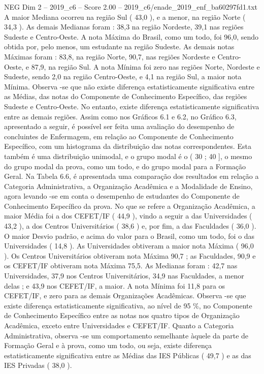 \begin{textsample}{NEG Dim 2 – 2019\_c6 – Score 2.00 – 2019\_c6/enade\_2019\_enf\_ba60297fd1.txt}
A maior Mediana ocorreu na região Sul ( 43,0 ), e a menor, na região Norte ( 34,3 ).
As demais Medianas foram : 38,3 na região Nordeste, 39,1 nas regiões Sudeste e Centro-Oeste.
A nota Máxima do Brasil, como um todo, foi 96,0, sendo obtida por, pelo menos, um estudante na região Sudeste.
As demais notas Máximas foram : 83,8, na região Norte, 90,7, nas regiões Nordeste e Centro-Oeste, e 87,9, na região Sul.
A nota Mínima foi zero nas regiões Norte, Nordeste e Sudeste, sendo 2,0 na região Centro-Oeste, e 4,1 na região Sul, a maior nota Mínima.
Observa -se que não existe diferença estatisticamente significativa entre as Médias, das notas do Componente de Conhecimento Específico, das regiões Sudeste e Centro-Oeste.
No entanto, existe diferença estatisticamente significativa entre as demais regiões.
Assim como nos Gráficos 6.1 e 6.2, no Gráfico 6.3, apresentado a seguir, é possível ser feita uma avaliação do desempenho de concluintes de Enfermagem, em relação ao Componente de Conhecimento Específico, com um histograma da distribuição das notas correspondentes.
Esta também é uma distribuição unimodal, e o grupo modal é o ( 30 ; 40 ], o mesmo do grupo modal da prova, como um todo, e do grupo modal para a Formação Geral.
Na Tabela 6.6, é apresentada uma comparação dos resultados em relação a Categoria Administrativa, a Organização Acadêmica e a Modalidade de Ensino, agora levando -se em conta o desempenho de estudantes do Componente de Conhecimento Específico da prova.
No que se refere a Organização Acadêmica, a maior Média foi a dos CEFET/IF ( 44,9 ), vindo a seguir a das Universidades ( 43,2 ), a dos Centros Universitários ( 38,6 ) e, por fim, a das Faculdades ( 36,0 ).
O maior Desvio padrão, e acima do valor para o Brasil, como um todo, foi o das Universidades ( 14,8 ).
As Universidades obtiveram a maior nota Máxima ( 96,0 ).
Os Centros Universitários obtiveram nota Máxima 90,7 ; as Faculdades, 90,9 e os CEFET/IF obtiveram nota Máxima 75,5.
As Medianas foram : 42,7 nas Universidades, 37,9 nos Centros Universitários, 34,9 nas Faculdades, a menor delas ; e 43,9 nos CEFET/IF, a maior.
A nota Mínima foi 11,8 para os CEFET/IF, e zero para as demais Organizações Acadêmicas.
Observa -se que existe diferença estatisticamente significativa, ao nível de 95 \%, no Componente de Conhecimento Específico entre as notas nos quatro tipos de Organização Acadêmica, exceto entre Universidades e CEFET/IF.
Quanto a Categoria Administrativa, observa -se um comportamento semelhante àquele da parte de Formação Geral e à prova, como um todo, ou seja, existe diferença estatisticamente significativa entre as Médias das IES Públicas ( 49,7 ) e as das IES Privadas ( 38,0 ).

\end{textsample}
